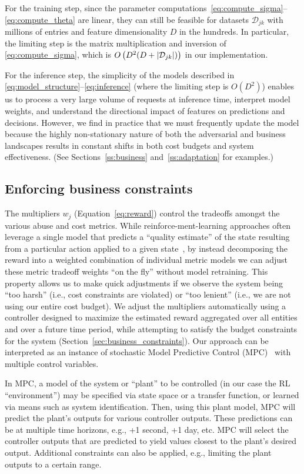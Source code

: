  For the training step, since the parameter computations~\eqref{eq:compute_sigma}--\eqref{eq:compute_theta} are linear, they can still be feasible for datasets $\mathcal{D}_{jk}$ with millions of entries and feature dimensionality $D$ in the hundreds. In particular, the limiting step is the matrix multiplication and inversion of \eqref{eq:compute_sigma}, which is $O\left(D^2 (D + \left|\mathcal{D}_{jk}\right|)\right)$ in our implementation.

For the inference step, the simplicity of the models described in \eqref{eq:model_structure}--\eqref{eq:inference} (where the limiting step is $O(D^2)$) enables us to process a very large volume of requests at inference time, interpret model weights, and understand the directional impact of features on predictions and decisions. However, we find in practice that we must frequently update the model because the highly non-stationary nature of both the adversarial and business landscapes results in constant shifts in both cost budgets and system effectiveness. (See Sections~\ref{ss:business} and~\ref{ss:adaptation} for examples.) 

\subsection{Enforcing business constraints} \label{sec:mpc}
The multipliers $w_{j}$ (Equation~\eqref{eq:reward}) control the tradeoffs amongst the various abuse and cost metrics. While reinforce-ment-learning approaches often leverage a single model that predicts a ``quality estimate'' of the state resulting from a particular action applied to a given state~\cite{mnih2015human}, by instead decomposing the reward into a weighted combination of individual metric models we can adjust these metric tradeoff weights ``on the fly'' without model retraining. This property allows us to make quick adjustments if we observe the system being ``too harsh'' (i.e., cost constraints are violated) or ``too lenient'' (i.e., we are not using our entire cost budget). We adjust the multipliers automatically using a controller 
designed to maximize the estimated reward aggregated over all entities and  over a future time period, while attempting to satisfy the budget constraints for the system (Section~\ref{sec:business_constraints}).  Our approach can be interpreted as an instance of stochastic Model Predictive Control (MPC)~\cite{mesbah2016stochastic} with multiple control variables. 

In MPC, a model of the system or ``plant'' to be controlled (in our case the RL ``environment'') may be specified via state space or a transfer function, or learned via means such as system identification. Then, using this plant model, MPC will predict the plant's outputs for various controller outputs. These predictions can be at multiple time horizons, e.g., +1 second, +1 day, etc. MPC will select the controller outputs that are predicted to yield values closest to the plant's desired output. Additional constraints can also be applied, e.g., limiting the plant outputs to a certain range. 

